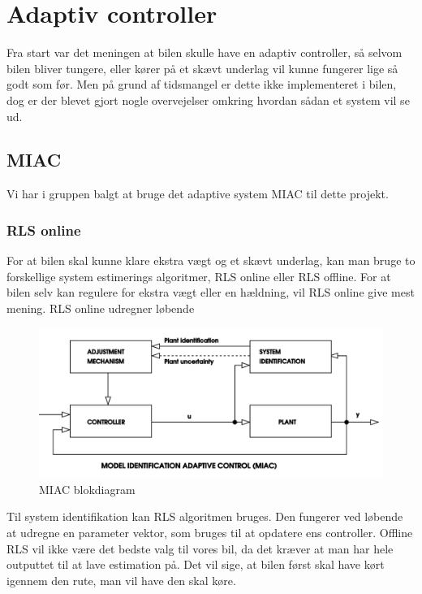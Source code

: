 \graphicspath{{Chapters/Overvejelser_for_udvidelser/}}

\section{Adaptiv controller}
Fra start var det meningen at bilen skulle have en adaptiv controller, så selvom bilen bliver tungere, eller kører på et skævt underlag vil kunne fungerer lige så godt som før. Men på grund af tidsmangel er dette ikke implementeret i bilen, dog er der blevet gjort nogle overvejelser omkring hvordan sådan et system vil se ud. 

\subsection{MIAC}
Vi har i gruppen balgt at bruge det adaptive system MIAC til dette projekt.


\subsubsection{RLS online}
For at bilen skal kunne klare ekstra vægt og et skævt underlag, kan man bruge to forskellige system estimerings algoritmer, RLS online eller RLS offline. For at bilen selv kan regulere for ekstra vægt eller en hældning, vil RLS online give mest mening. RLS online udregner løbende 
 
\begin{figure}[H]
	\centering
	\includegraphics[width = 400pt]{Img/MIAC.png}
	\caption{MIAC blokdiagram}
	\label{fig:MIAC}
\end{figure}

Til system identifikation kan RLS algoritmen bruges. Den fungerer ved løbende at udregne en parameter vektor, som bruges til at opdatere ens controller. Offline RLS vil ikke være det bedste valg til vores bil, da det kræver at man har hele outputtet til at lave estimation på. Det vil sige, at bilen først skal have kørt igennem den rute, man vil have den skal køre.


